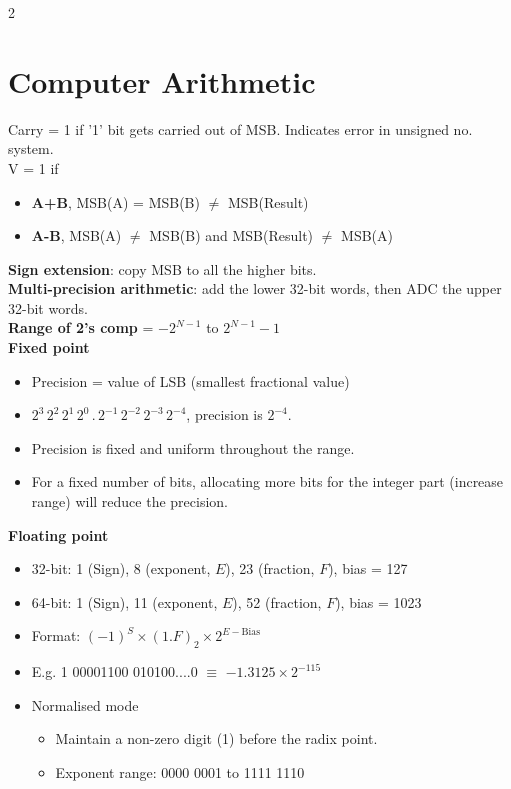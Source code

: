 \documentclass[10pt]{article}
\begin{document}
\begin{multicols}{2}

\section*{Computer Arithmetic}
{}
Carry = 1 if '1' bit gets carried out of MSB. Indicates error in unsigned no. system.\\
V = 1 if 
\begin{itemize}
    \item \textbf{A+B}, MSB(A) = MSB(B) $\neq$ MSB(Result)
    \item \textbf{A-B}, MSB(A) $\neq$ MSB(B) and MSB(Result) $\neq$ MSB(A)
\end{itemize}
\textbf{Sign extension}: copy MSB to all the higher bits.\\
\textbf{Multi-precision arithmetic}: add the lower 32-bit words, then ADC the upper 32-bit words.\\
\textbf{Range of 2's comp} = $-2^{N-1}$ to $2^{N-1}-1$\\
\textbf{Fixed point}
\begin{itemize}
    \item Precision = value of LSB (smallest fractional value)
    \item $2^3\,2^2\,2^1\,2^0\,.\,2^{-1}\,2^{-2}\,2^{-3}\,2^{-4}$, precision is $2^{-4}$.
    \item Precision is fixed and uniform throughout the range.
    \item For a fixed number of bits, allocating more bits for the integer part (increase range) will reduce the precision.
\end{itemize}
\textbf{Floating point}
\begin{itemize}
    \item 32-bit: 1 (Sign), 8 (exponent, $E$), 23 (fraction, $F$), bias = 127
    \item 64-bit: 1 (Sign), 11 (exponent, $E$), 52 (fraction, $F$), bias = 1023
    \item Format: $(-1)^S \times (1.F)_2 \times 2^{E - \text{Bias}}$
    \item E.g. 1 00001100 010100....0 $\equiv$ $-1.3125\times 2^{-115}$
    \item Normalised mode
    \begin{itemize}
        \item Maintain a non-zero digit (1) before the radix point.
        \item Exponent range: 0000 0001 to 1111 1110

\end{itemize}
\end{itemize}
\end{multicols}
\end{document}
